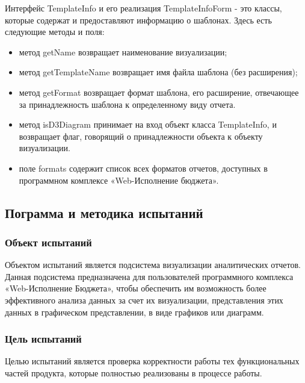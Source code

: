 \documentclass[a4paper]{extarticle}
\begin{document}
Интерфейс TemplateInfo и его реализация TemplateInfoForm - это классы, которые содержат и предоставляют информацию о шаблонах. Здесь есть следующие методы и поля:
\begin{itemize}
\item метод getName возвращает наименование визуализации;
\item метод getTemplateName возвращает имя файла шаблона (без расширения);
\item метод getFormat возвращает формат шаблона, его расширение, отвечающее за принадлежность шаблона к определенному виду отчета.
\item метод isD3Diagram принимает на вход объект класса TemplateInfo, и возвращает флаг, говорящий о принадлежности объекта к объекту визуализации.
\item поле formats содержит список всех форматов отчетов, доступных в программном комплексе «Web-Исполнение бюджета».
\end{itemize}

\subsection{Пограмма и методика испытаний}

\subsubsection{Объект испытаний}
Объектом испытаний является подсистема визуализации аналитических отчетов. Данная подсистема предназначена для пользователей программного комплекса «Web-Исполнение Бюджета», чтобы обеспечить им возможность более эффективного анализа данных за счет их визуализации, представления этих данных в графическом представлении, в виде графиков или диаграмм.

\subsubsection{Цель испытаний}
Целью испытаний является проверка корректности работы тех функциональных частей продукта, которые полностью реализованы в процессе  работы.\par
\end{document}
